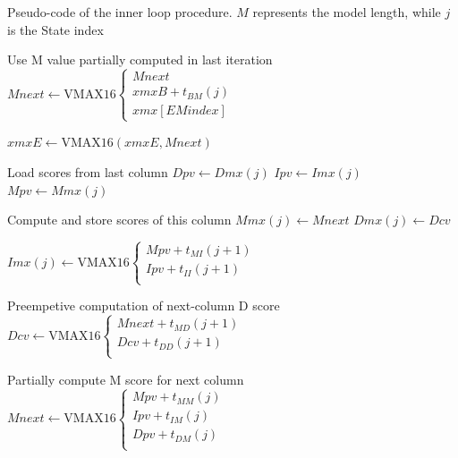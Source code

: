 \documentclass{bmcart}
\begin{document}
\begin{algorithm}[h!]
\caption{Pseudo-code of the inner loop procedure. $M$ represents the model length, while $j$ is the State index}
\label{code-compute}

\begin{algorithmic}[1]
\item[]
\item[]
\LeftComment Use M value partially computed in last iteration
\State $ Mnext \gets \mathrm{VMAX16}
			\begin{cases}
				Mnext \\						
				xmxB + t_{BM}(j)	\\
				xmx[EMindex]
			\end{cases} $ 
\item[]
\item[]
\State $ xmxE \gets \mathrm{VMAX16}(xmxE, Mnext) $		
\item[]
\LeftComment Load scores from last column
\State $ Dpv \gets Dmx(j) $
\State $ Ipv  \gets Imx(j)  $
\State $ Mpv \gets Mmx(j) $
\item[]
\LeftComment Compute and store scores of this column
\State $ Mmx(j) \gets Mnext $
\State $ Dmx(j) \gets Dcv   $

\State $ Imx(j) \gets \mathrm{VMAX16}
			\begin{cases}
				Mpv + t_{MI}(j+1)	\\
				Ipv + t_{II}(j+1)	\\
			\end{cases} $ 
\item[]
\item[]
\LeftComment Preempetive computation of next-column D score
\State $ Dcv \gets \mathrm{VMAX16}
			\begin{cases}
				Mnext +  t_{MD}(j+1)	\\
				Dcv +  t_{DD}(j+1)	\\
			\end{cases} $ 
\item[]
\item[]
\LeftComment Partially compute M score for next column
\State $ Mnext \gets \mathrm{VMAX16}
			\begin{cases}
				Mpv + t_{MM}(j)	\\
				Ipv + t_{IM}(j)	\\
				Dpv + t_{DM}(j)	\\
			\end{cases} $ 
\item[]
\EndProcedure
\end{algorithmic}
\end{algorithm}
\end{document}
